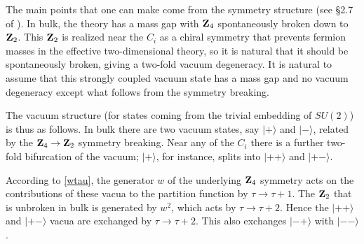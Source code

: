 \documentclass[12pt]{article}
\numberwithin{equation}{section}
\begin{document}
The main points that one can make come from the symmetry structure (see \S2.7
of \cite{switten}).
In bulk, the theory has a mass gap with ${\bf Z}_4$ spontaneously
broken down to ${\bf Z}_2$.  This ${\bf Z}_2$ is realized near the
$C_i$ as a chiral symmetry that prevents fermion
masses in the effective two-dimensional theory, so it is natural that
it should be spontaneously broken, giving a two-fold vacuum degeneracy.
It is natural to assume that this strongly coupled vacuum state
has a mass gap and no vacuum degeneracy except what follows from the
symmetry breaking.

The vacuum structure (for states coming from the trivial embedding
of $SU(2)$) is thus as follows.  In bulk there are two vacuum
states, say $|+\rangle$ and $|-\rangle$, related by the
${\bf Z}_4\to {\bf Z}_2$ symmetry breaking.  Near any of the $C_i$
there is a further two-fold bifurcation of the vacuum;
$|+\rangle$, for instance, splits into $|++\rangle$ and $|+-\rangle$.

According to \eqref{wtau}, the generator $w$ of the underlying ${\bf
Z}_4$ symmetry
acts on the contributions of these vacua to the partition function
by $\tau\to\tau+1$.  The ${\bf Z}_2$ that is unbroken in bulk
is generated by $w^2$, which acts by $\tau\to\tau+2$.  Hence
the $|++\rangle$ and $|+-\rangle$ vacua are exchanged by $\tau\to\tau+2$.
This also exchanges $|-+\rangle$ with $|--\rangle$.
\end{document}

